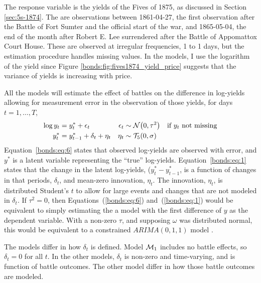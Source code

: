 The response variable is the yields of the Fives of 1875, as discussed in Section \ref{sec:5s-1874}.
The are  observations between 1861-04-27, the first observation after the Battle of Fort Sumter and the official start of the war, and 1865-05-04, the end of the month after Robert E. Lee surrendered after the Battle of Appomattox Court House.
These are observed at irregular frequencies, 1 to 1 days, but the estimation procedure handles missing values.
In the models, I use the logarithm of the yield since Figure \ref{bonds:fig:fives1874_yield_price} suggests that the variance of yields is increasing with price.

All the models will estimate the effect of battles on the difference in log-yields allowing for measurement error in the observation of those yields, for days $t = 1, \dots, T$,
\begin{align}
  \label{bonds:eq:6}
  \log y_{t} &= y^{*}_{t} + \epsilon_{t} & \epsilon_{t} &\sim \mathcal{N}\mathopen{}\left(0, \tau^{2}\right)\mathclose{} & \text{if $y_t$ not missing} \\
  \label{bonds:eq:1}
  y^{*}_{t} &= y^{*}_{t - 1} + \delta_{t} + \eta_{t} & \eta_{t} &\sim \mathcal{T}_{5}\mathopen{}\left(0, \sigma\right)\mathclose{}
\end{align}
Equation~\eqref{bonds:eq:6} states that observed log-yields are observed with error, and $y^{*}$ is a latent variable representing the ``true'' log-yields.
Equation~\eqref{bonds:eq:1} states that the change in the latent log-yields, ($y^{*}_{t} - y^{*}_{t-1}$, is a function of changes in that periods, $\delta_{t}$, and mean-zero innovation, $\eta_{t}$.
The innovation, $\eta_{t}$, is distributed Student's $t$ to allow for large events and changes that are not modeled in $\delta_{t}$.
If $\tau^{2} = 0$, then Equations~(\ref{bonds:eq:6}) and~(\ref{bonds:eq:1}) would be equivalent to simply estimating the a model with the first difference of $y$ as the dependent variable.
With a non-zero $\tau$, and supposing $\omega$ was distributed normal, this would be equivalent to a constrained $ARIMA(0, 1, 1)$ model \parencite[91]{PetrisPetroneEtAl2009}.


The models differ in how $\delta_{t}$ is defined.
Model $\mathcal{M}_{\text{1}}$ includes no battle effects, so $\delta_{t} = 0$ for all $t$.
In the other models, $\delta_{t}$ is non-zero and time-varying, and is function of battle outcomes.
The other model differ in how those battle outcomes are modeled.

